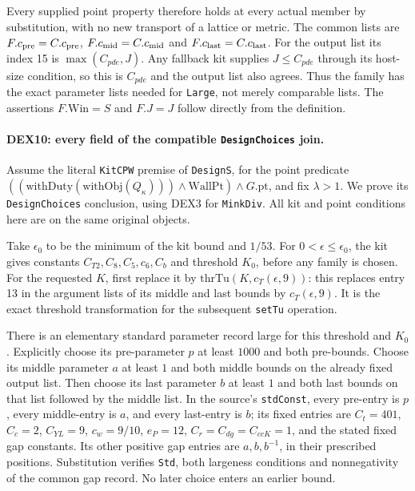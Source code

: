 Every supplied point property therefore holds at every actual member
by substitution, with no new transport of a lattice or metric.
The common lists are $F.c_{\rm pre}=C.c_{\rm pre}$,
$F.c_{\rm mid}=C.c_{\rm mid}$ and $F.c_{\rm last}=C.c_{\rm last}$.
For the output list its index 15 is $\max(C_{pde},J)$.
Any fallback kit supplies $J\le C_{pde}$ through its host-size
condition, so this is $C_{pde}$ and the output list also agrees.
Thus the family has the exact parameter lists needed for
\texttt{Large}, not merely comparable lists. The assertions
$F.\mathrm{Win}=S$ and $F.J=J$ follow directly from the definition.

\paragraph{DEX10: every field of the compatible \texttt{DesignChoices} join.}
\label{claim:DEX10}
Assume the literal \texttt{KitCPW} premise of \texttt{DesignS}, for
the point predicate
$((\mathrm{withDuty}(\mathrm{withObj}(Q_\kappa)))\wedge
\mathrm{WallPt})\wedge G.\mathrm{pt}$, and fix $\lambda>1$.
We prove its \texttt{DesignChoices} conclusion, using DEX3 for
\texttt{MinkDiv}. All kit and point conditions here are on the
same original objects.

Take $\epsilon_0$ to be the minimum of the kit bound and $1/53$.
For $0<\epsilon\le\epsilon_0$, the kit gives constants
$C_{T2},C_8,C_5,c_6,C_b$ and threshold $K_0$, before any family
is chosen. For the requested $K$, first replace it by
$\mathrm{thrTu}(K,c_T(\epsilon,9))$: this replaces entry 13 in the
argument lists of its middle and last bounds by $c_T(\epsilon,9)$.
It is the exact threshold transformation for the subsequent
\texttt{setTu} operation.

There is an elementary standard parameter record large for this
threshold and $K_0$. Explicitly choose its pre-parameter $p$ at least
$1000$ and both pre-bounds. Choose its middle parameter $a$ at least
$1$ and both middle bounds on the already fixed output list. Then
choose its last parameter $b$ at least $1$ and both last bounds on
that list followed by the middle list. In the source's
\texttt{stdConst}, every pre-entry is $p$, every middle-entry is $a$,
and every last-entry is $b$; its fixed entries are
$C_t=401$, $C_c=2$, $C_{YL}=9$, $c_w=9/10$, $e_P=12$,
$C_r=C_{dg}=C_{ccK}=1$, and the stated fixed gap constants.
Its other positive gap entries are $a,b,b^{-1}$, in their prescribed
positions. Substitution verifies \texttt{Std}, both largeness
conditions and nonnegativity of the common gap record. No later
choice enters an earlier bound.

